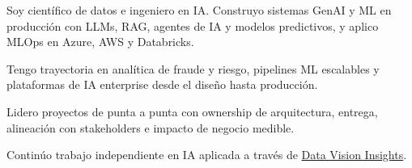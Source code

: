 
{\small\color{cvtext}%
\noindent Soy científico de datos e ingeniero en IA. Construyo sistemas GenAI y ML en producción con LLMs, RAG, agentes de IA y modelos predictivos, y aplico MLOps en Azure, AWS y Databricks.\par
\vspace{0.14em}%
\noindent Tengo trayectoria en analítica de fraude y riesgo, pipelines ML escalables y plataformas de IA enterprise desde el diseño hasta producción.\par
\vspace{0.14em}%
\noindent Lidero proyectos de punta a punta con ownership de arquitectura, entrega, alineación con stakeholders e impacto de negocio medible.\par
\vspace{0.14em}%
\noindent Continúo trabajo independiente en IA aplicada a través de \href{https://datavisioninsights.com/}{Data Vision Insights}.\par
}
